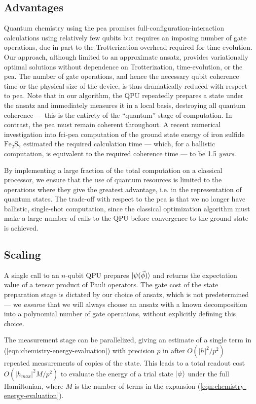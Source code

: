 \subsection{Advantages}
Quantum chemistry using the \gls{pea} promises full-configuration-interaction calculations using relatively few qubits but requires an imposing number of gate operations, due in part to the Trotterization overhead required for time evolution. Our approach, although limited to an approximate ansatz, provides variationally optimal solutions without dependence on Trotterization, time-evolution, or the \gls{pea}. The number of gate operations, and hence the necessary qubit coherence time or the physical size of the device, is thus dramatically reduced with respect to \gls{pea}. Note that in our algorithm, the QPU repeatedly prepares a state under the ansatz and immediately measures it in a local basis, destroying all quantum coherence --- this is the entirety of the ``quantum'' stage of computation. In contrast, the \gls{pea} must remain coherent throughout. A recent numerical investigation \cite{Wecker2013} into \gls{fci}-\gls{pea} computation of the ground state energy of iron sulfide $\mathrm{Fe_2S_2}$ estimated the required calculation time --- which, for a ballistic computation, is equivalent to the required coherence time --- to be 1.5 \emph{years}.

By implementing a large fraction of the total computation on a classical processor, we ensure that the use of quantum resources is limited to the operations where they give the greatest advantage, i.e. in the representation of quantum states. The trade-off with respect to the \gls{pea} is that we no longer have ballistic, single-shot computation, since the classical optimization algorithm must make a large number of calls to the QPU before convergence to the ground state is achieved. 

\subsection{Scaling}
A single call to an $n$-qubit QPU prepares $\mbox{$ | \psi(\vec{\phi}) \rangle $}$ and returns the expectation value of a tensor product of Pauli operators.  The gate cost of the state preparation stage is dictated by our choice of ansatz, which is not predetermined --- we \emph{assume} that we will always choose an ansatz with a known decomposition into a polynomial number of gate operations, without explicitly defining this choice. 

The measurement stage can be parallelized, giving an estimate of a single term in (\ref{eqn:chemistry-energy-evaluation}) with precision $p$ in after $O(|h|^2/p^2)$ repeated measurements of copies of the state. This leads to a total readout cost $O(|h_{max}|^2M/p^2)$ to evaluate the energy of a trial state $\mbox{$ | \psi \rangle $}$ under the full Hamiltonian, where $M$ is the number of terms in the expansion (\ref{eqn:chemistry-energy-evaluation}).  

